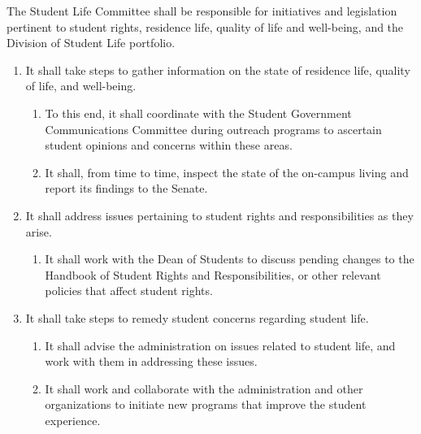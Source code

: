\item The Student Life Committee shall be responsible for initiatives and legislation pertinent to student rights, residence life, quality of life and well-being, and the Division of Student Life portfolio.
\begin{enumerate}
\item It shall take steps to gather information on the state of residence life, quality of life, and well-being.
\begin{enumerate}
\item To this end, it shall coordinate with the Student Government Communications Committee during outreach programs to
ascertain student opinions and concerns within these areas.
\item It shall, from time to time, inspect the state of the on-campus living and report its findings to the Senate.
\end{enumerate}
\item It shall address issues pertaining to student rights and responsibilities as they arise.
\begin{enumerate}
\item It shall work with the Dean of Students to discuss pending changes to the Handbook of Student Rights and
Responsibilities, or other relevant policies that affect student rights.
\end{enumerate}
\item It shall take steps to remedy student concerns regarding student life.
\begin{enumerate}
\item It shall advise the administration on issues related to student life, and work with them in addressing these issues.
\item It shall work and collaborate with the administration and other organizations to initiate new programs that improve the
student experience.
\end{enumerate}
\end{enumerate}
